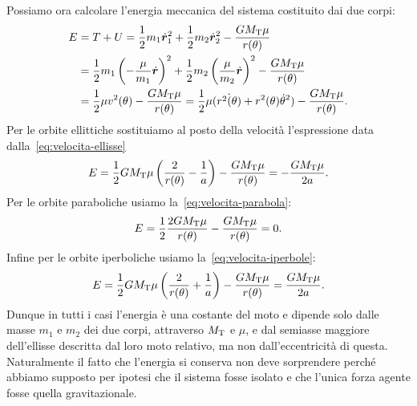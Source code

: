 Possiamo ora calcolare l'energia meccanica del sistema costituito dai due corpi:
\begin{equation}
  \label{eq:energia}
  \begin{split}
    E &= T + U = \frac{1}{2}m_1\dot{\bm{r}}_1^2 + \frac{1}{2}m_2\dot{\bm{r}}_2^2
    - \frac{GM_\textup{T}\mu}{r(\theta)} \\
    &= \frac{1}{2}m_1
    \left(
      -\frac{\mu}{m_1}\dot{\bm{r}}
    \right)^2 + \frac{1}{2}m_2
    \left(
      \frac{\mu}{m_2}\dot{\bm{r}}
    \right)^2 - \frac{GM_\textup{T}\mu}{r(\theta)} \\
    &= \frac{1}{2}\mu v^2(\theta)
    - \frac{GM_\textup{T}\mu}{r(\theta)} = \frac{1}{2}\mu(\dot{r^2(\theta)} +
    r^2(\theta)\dot{\theta}^2) - \frac{GM_\textup{T}\mu}{r(\theta)}.
  \end{split}
\end{equation}
Per le orbite ellittiche sostituiamo al posto della velocità l'espressione data
dalla~\eqref{eq:velocita-ellisse}
\begin{equation}
  \label{eq:energia-ellisse}
  E = \frac{1}{2}GM_\textup{T}\mu
  \left(
    \frac{2}{r(\theta)} - \frac{1}{a}
  \right) - \frac{GM_\textup{T}\mu}{r(\theta)} = -\frac{GM_\textup{T}\mu}{2a}.
\end{equation}
Per le orbite paraboliche usiamo la~\eqref{eq:velocita-parabola}:
\begin{equation}
  E = \frac{1}{2}\frac{2GM_\textup{T}\mu}{r(\theta)} -
  \frac{GM_\textup{T}\mu}{r(\theta)} = 0.
\end{equation}
Infine per le orbite iperboliche usiamo la~\eqref{eq:velocita-iperbole}:
\begin{equation}
    \label{eq:energia-iperbole}
  E = \frac{1}{2}GM_\textup{T}\mu
  \left(
    \frac{2}{r(\theta)} + \frac{1}{a}
  \right) - \frac{GM_\textup{T}\mu}{r(\theta)} = \frac{GM_\textup{T}\mu}{2a}.
\end{equation}
Dunque in tutti i casi l'energia è una costante del moto e dipende solo dalle
masse $m_1$ e $m_2$ dei due corpi, attraverso $M_\textup{T}$ e $\mu$, e dal
semiasse maggiore dell'ellisse descritta dal loro moto relativo, ma non
dall'eccentricità di questa. Naturalmente il fatto che l'energia si conserva non
deve sorprendere perché abbiamo supposto per ipotesi che il sistema fosse
isolato e che l'unica forza agente fosse quella
gravitazionale.

